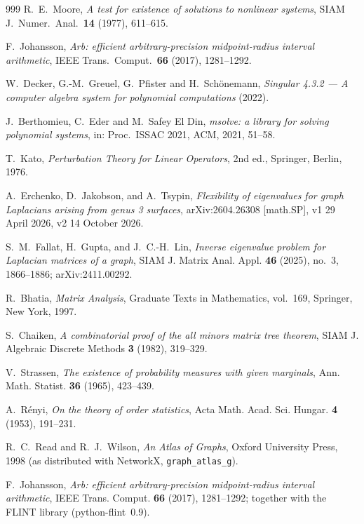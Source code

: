 \documentclass[11pt]{amsart}
\theoremstyle{definition}
\theoremstyle{remark}
\begin{document}
\begin{thebibliography}{999}
R.~E.~Moore,
\emph{A test for existence of solutions to nonlinear systems},
SIAM J.~Numer.~Anal.~\textbf{14} (1977), 611--615.

F.~Johansson,
\emph{Arb: efficient arbitrary-precision midpoint-radius interval arithmetic},
IEEE Trans.~Comput.~\textbf{66} (2017), 1281--1292.

W.~Decker, G.-M.~Greuel, G.~Pfister and H.~Sch\"onemann,
\emph{Singular 4.3.2 --- A computer algebra system for polynomial computations} (2022).

J.~Berthomieu, C.~Eder and M.~Safey El Din,
\emph{msolve: a library for solving polynomial systems},
in: Proc.\ ISSAC 2021, ACM, 2021, 51--58.

T.~Kato,
\emph{Perturbation Theory for Linear Operators}, 2nd ed., Springer, Berlin, 1976.

A.~Erchenko, D.~Jakobson, and A.~Tsypin,
\emph{Flexibility of eigenvalues for graph Laplacians arising from genus 3 surfaces},
arXiv:2604.26308 [math.SP], v1 29 April 2026, v2 14 October 2026.

S.~M.~Fallat, H.~Gupta, and J.~C.-H.~Lin,
\emph{Inverse eigenvalue problem for Laplacian matrices of a graph},
SIAM J. Matrix Anal. Appl. \textbf{46} (2025), no.~3, 1866--1886;
arXiv:2411.00292.

R.~Bhatia,
\emph{Matrix Analysis},
Graduate Texts in Mathematics, vol.~169, Springer, New York, 1997.

S.~Chaiken,
\emph{A combinatorial proof of the all minors matrix tree theorem},
SIAM J. Algebraic Discrete Methods \textbf{3} (1982), 319--329.

V.~Strassen,
\emph{The existence of probability measures with given marginals},
Ann. Math. Statist. \textbf{36} (1965), 423--439.

A.~R\'enyi,
\emph{On the theory of order statistics},
Acta Math. Acad. Sci. Hungar. \textbf{4} (1953), 191--231.

R.~C.~Read and R.~J.~Wilson,
\emph{An Atlas of Graphs},
Oxford University Press, 1998 (as distributed with NetworkX, \texttt{graph\_atlas\_g}).

F.~Johansson,
\emph{Arb: efficient arbitrary-precision midpoint-radius interval arithmetic},
IEEE Trans. Comput. \textbf{66} (2017), 1281--1292; together with the FLINT library
(python-flint~0.9).

\end{thebibliography}
\end{document}
